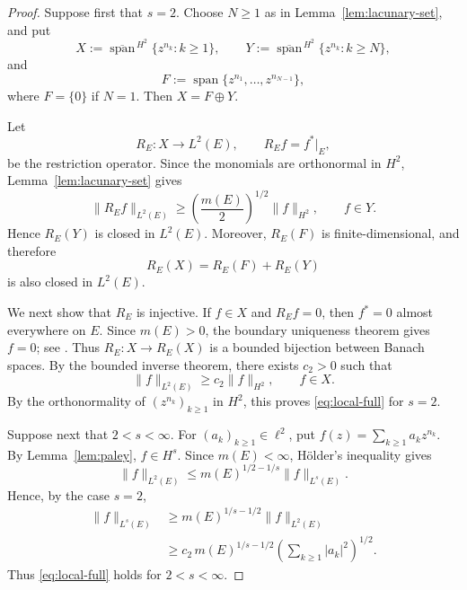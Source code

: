\documentclass[11pt, reqno]{amsart}
\theoremstyle{definition}
\theoremstyle{remark}
\begin{document}
\begin{proof}
Suppose first that \(s=2\).  Choose \(N\ge1\) as in
Lemma~\ref{lem:lacunary-set}, and put
\[
        X
        :=
        \overline{\operatorname{span}}^{\,H^2}
        \{z^{n_k}:k\ge1\},
        \qquad
        Y
        :=
        \overline{\operatorname{span}}^{\,H^2}
        \{z^{n_k}:k\ge N\},
\]
and
\[
        F
        :=
        \operatorname{span}
        \{z^{n_1},\ldots,z^{n_{N-1}}\},
\]
where \(F=\{0\}\) if \(N=1\). Then
\(
        X=F\oplus Y.
\)

Let
\[
        R_E:X\longrightarrow L^2(E),
        \qquad
        R_Ef=f^*|_E,
\]
be the restriction operator. Since the monomials are orthonormal in
\(H^2\), Lemma~\ref{lem:lacunary-set} gives
\[
        \|R_Ef\|_{L^2(E)}
        \ge
        \left(\frac{m(E)}{2}\right)^{1/2}
        \|f\|_{H^2},
        \qquad
        f\in Y.
\]
Hence \(R_E(Y)\) is closed in \(L^2(E)\). Moreover, \(R_E(F)\) is
finite-dimensional, and therefore
\[
        R_E(X)
        =
        R_E(F)+R_E(Y)
\]
is also closed in \(L^2(E)\).

We next show that \(R_E\) is injective. If \(f\in X\) and \(R_Ef=0\),
then \(f^*=0\) almost everywhere on \(E\). Since \(m(E)>0\), the
boundary uniqueness theorem gives \(f=0\); see
\cite[Ch.~II, Theorem~2.2]{Duren1970}. Thus
\(
        R_E:X\longrightarrow R_E(X)
\)
is a bounded bijection between Banach spaces. By the bounded inverse
theorem, there exists \(c_2>0\) such that
\[
        \|f\|_{L^2(E)}
        \ge
        c_2\|f\|_{H^2},
        \qquad
        f\in X.
\]
By the orthonormality of \((z^{n_k})_{k\ge1}\) in \(H^2\), this proves
\eqref{eq:local-full} for \(s=2\).

Suppose next that \(2<s<\infty\). For
\((a_k)_{k\ge1}\in\ell^2\), put
\(
        f(z)=\sum_{k\ge1}a_kz^{n_k}.
\)
By Lemma~\ref{lem:paley}, \(f\in H^s\). Since \(m(E)<\infty\),
H\"older's inequality gives
\[
        \|f\|_{L^2(E)}
        \le
        m(E)^{1/2-1/s}\|f\|_{L^s(E)}.
\]
Hence, by the case \(s=2\),
\[
\begin{aligned}
        \|f\|_{L^s(E)}
        &\ge
        m(E)^{1/s-1/2}\|f\|_{L^2(E)}\\
        &\ge
        c_2\,m(E)^{1/s-1/2}
        \left(\sum_{k\ge1}|a_k|^2\right)^{1/2}.
\end{aligned}
\]
Thus \eqref{eq:local-full} holds for \(2<s<\infty\).


\end{proof}
\end{document}
